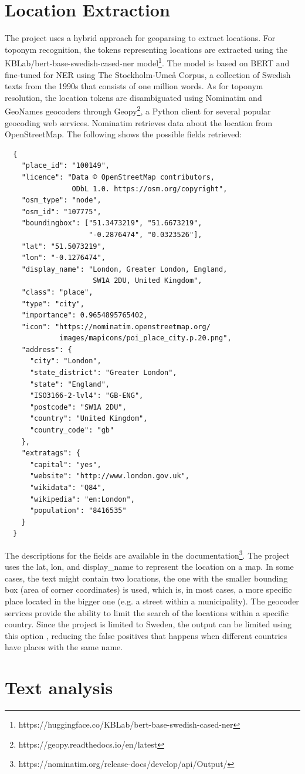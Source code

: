 \section{Location Extraction}

The project uses a hybrid approach for geoparsing to extract locations. For toponym recognition, the
tokens representing locations are extracted using the KBLab/bert-base-swedish-cased-ner
model\footnote{https://huggingface.co/KBLab/bert-base-swedish-cased-ner}. The model is based on BERT
and fine-tuned for \ac{NER} using The Stockholm-Umeå Corpus, a collection of Swedish texts from the
1990s that consists of one million words. As for toponym resolution, the location tokens are
disambiguated using Nominatim and GeoNames geocoders through
Geopy\footnote{https://geopy.readthedocs.io/en/latest}, a Python client for several
popular geocoding web services. Nominatim retrieves data about the location from OpenStreetMap. The
following shows the possible fields retrieved:

  \begin{verbatim}
  {
    "place_id": "100149",
    "licence": "Data © OpenStreetMap contributors, 
                ODbL 1.0. https://osm.org/copyright",
    "osm_type": "node",
    "osm_id": "107775",
    "boundingbox": ["51.3473219", "51.6673219", 
                    "-0.2876474", "0.0323526"],
    "lat": "51.5073219",
    "lon": "-0.1276474",
    "display_name": "London, Greater London, England, 
                     SW1A 2DU, United Kingdom",
    "class": "place",
    "type": "city",
    "importance": 0.9654895765402,
    "icon": "https://nominatim.openstreetmap.org/
             images/mapicons/poi_place_city.p.20.png",
    "address": {
      "city": "London",
      "state_district": "Greater London",
      "state": "England",
      "ISO3166-2-lvl4": "GB-ENG",
      "postcode": "SW1A 2DU",
      "country": "United Kingdom",
      "country_code": "gb"
    },
    "extratags": {
      "capital": "yes",
      "website": "http://www.london.gov.uk",
      "wikidata": "Q84",
      "wikipedia": "en:London",
      "population": "8416535"
    }
  }                           
  \end{verbatim}

The descriptions for the fields are available in the
documentation\footnote{https://nominatim.org/release-docs/develop/api/Output/}. The project uses
the lat, lon, and display\_name to represent the location on a map. In some cases, the text might
contain two locations, the one with the smaller bounding box (area of corner coordinates) is used,
which is, in most cases, a more specific place located in the bigger one (e.g. a street within a
municipality). The geocoder services provide the ability to limit the search of the locations
within a specific country. Since the project is limited to Sweden, the output can be limited using
this option , reducing the false positives that happens when different countries have places with
the same name.

\section{Text analysis}
  
